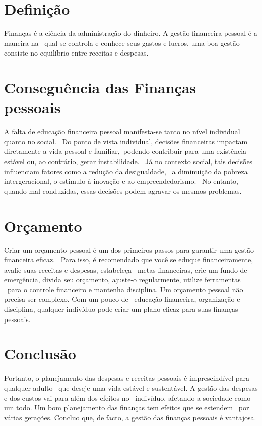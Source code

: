 \documentclass[a4paper,11pt]{report}
\begin{document}
		\begin{multicols}{2}

			\section{Definição \cite{intro:intro}}
				\hspace{1cm} Finanças é a ciência da administração do dinheiro. A gestão financeira pessoal é a maneira na \
				qual se controla e conhece seus gastos e lucros, uma boa gestão consiste no equilíbrio entre receitas e despesas.

			\section{Conseguência das Finanças pessoais \cite{intro:desenvolvimento}}
				\hspace{1cm} A falta de educação financeira pessoal manifesta-se tanto no nível individual quanto no social. \
				Do ponto de vista individual, decisões financeiras impactam diretamente a vida pessoal e familiar,\
				podendo contribuir para uma existência estável ou, ao contrário, gerar instabilidade. \
				Já no contexto social, tais decisões influenciam fatores como a redução da desigualdade, \
				a diminuição da pobreza intergeracional, o estímulo à inovação e ao empreendedorismo. \
				No entanto, quando mal conduzidas, essas decisões podem agravar os mesmos problemas.
			
			\section{Orçamento \cite{intro:orcamento}}
				\hspace{1cm} Criar um orçamento pessoal é um dos primeiros passos para garantir uma gestão financeira eficaz. \
				Para isso, é recomendado que você se eduque financeiramente, avalie suas receitas e despesas, estabeleça \
				metas financeiras, crie um fundo de emergência, divida seu orçamento, ajuste-o regularmente, utilize ferramentas \
				para o controle financeiro e mantenha disciplina. Um orçamento pessoal não precisa ser complexo. Com um pouco de \ 
				educação financeira, organização e disciplina, qualquer indivíduo pode criar um plano eficaz para suas finanças pessoais.

			\section{Conclusão}
				\hspace{1cm} Portanto, o planejamento das despesas e receitas pessoais é imprescindível para qualquer adulto \
				que deseje uma vida estável e sustentável. A gestão das despesas e dos custos vai para além dos efeitos no \
				indivíduo, afetando a sociedade como um todo. Um bom planejamento das finanças tem efeitos que se estendem \
				por várias gerações. Concluo que, de facto, a gestão das finanças pessoais é vantajosa.
		\end{multicols}
\end{document}
